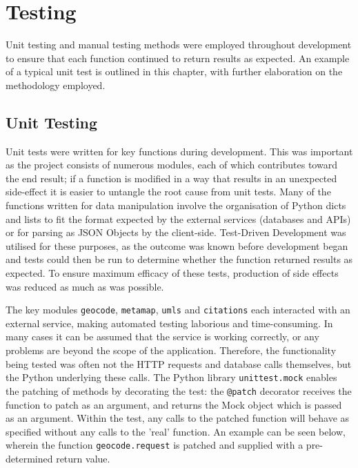 \documentclass[Report.tex]{subfiles}
\begin{document}
\chapter{Testing}
Unit testing and manual testing methods were employed throughout development to ensure that each function continued to return results as expected. An example of a typical unit test is outlined in this chapter, with further elaboration on the methodology employed.

\section{Unit Testing}
Unit tests were written for key functions during development. This was important as the project consists of numerous modules, each of which contributes toward the end result; if a function is modified in a way that results in an unexpected side-effect it is easier to untangle the root cause from unit tests. Many of the functions written for data manipulation involve the organisation of Python dicts and lists to fit the format expected by the external services (databases and APIs) or for parsing as JSON Objects by the client-side. Test-Driven Development was utilised for these purposes, as the outcome was known before development began and tests could then be run to determine whether the function returned results as expected. To ensure maximum efficacy of these tests, production of side effects was reduced as much as was possible. \newline

\noindent The key modules \texttt{geocode}, \texttt{metamap}, \texttt{umls} and \texttt{citations} each interacted with an external service, making automated testing laborious and time-consuming. In many cases it can be assumed that the service is working correctly, or any problems are beyond the scope of the application. Therefore, the functionality being tested was often not the HTTP requests and database calls themselves, but the Python underlying these calls. The Python library \texttt{unittest.mock} enables the patching of methods by decorating the test: the \texttt{@patch} decorator receives the function to patch as an argument, and returns the Mock object which is passed as an argument. Within the test, any calls to the patched function will behave as specified without any calls to the 'real' function. An example can be seen below, wherein the function \texttt{geocode.request} is patched and supplied with a pre-determined return value.\newpage
\end{document}
